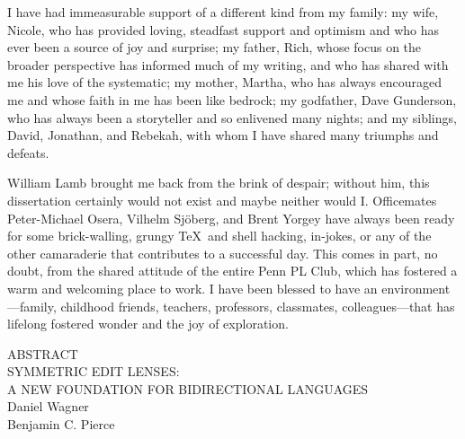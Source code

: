 \documentclass[12pt]{report}
\numberwithin{equation}{section}
\def\thetitle{\uppercase{Symmetric Edit Lenses:\\A New Foundation For Bidirectional Languages}}
\def\theauthor{Daniel Wagner}
\def\theadvisor{Benjamin C. Pierce}
\begin{document}
I have had immeasurable support of a different kind from my family: my wife,
Nicole, who has provided loving, steadfast support and optimism and who has
ever been a source of joy and surprise; my father, Rich, whose focus on the
broader perspective has informed much of my writing, and who has shared with
me his love of the systematic; my mother, Martha, who has always encouraged
me and whose faith in me has been like bedrock; my godfather, Dave
Gunderson, who has always been a storyteller and so enlivened many nights;
and my siblings, David, Jonathan, and Rebekah, with whom I have shared many
triumphs and defeats.

William Lamb brought me back from the brink of despair; without him, this
dissertation certainly would not exist and maybe neither would I.
Officemates Peter-Michael Osera, Vilhelm Sj\"oberg, and Brent Yorgey have
always been ready for some brick-walling, grungy \TeX\ and shell hacking,
in-jokes, or any of the other camaraderie that contributes to a successful
day. This comes in part, no doubt, from the shared attitude of the entire
Penn PL Club, which has fostered a warm and welcoming place to work. I have
been blessed to have an environment---family, childhood friends, teachers,
professors, classmates, colleagues---that has lifelong fostered wonder and
the joy of exploration.


\newpage
\doublespacing

\begin{center}
  ABSTRACT\\
  \thetitle\\
  \theauthor\\
  \theadvisor
\end{center}
\end{document}
